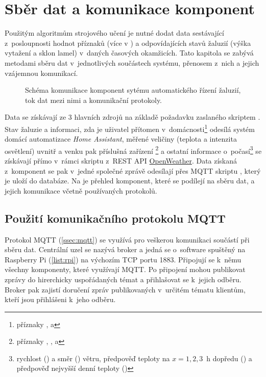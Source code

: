 \chapter{Sběr dat a komunikace komponent} \label{chap:dataCollection}
  Použitým algoritmům strojového učení je nutné dodat data sestávající z~posloupnosti hodnot příznaků (více v ) a odpovídajících stavů žaluzií (výška vytažení a sklon lamel) v~daných časových okamžicích. Tato kapitola se zabývá metodami sběru dat v~jednotlivých součástech systému, přenosem z~nich a jejich vzájemnou komunikací.
  
  \begin{figure}[H]
    \centering
    
    \caption[Schéma komunikace komponent]{Schéma komunikace komponent sytému automatického řízení žaluzií, tok dat mezi nimi a komunikační protokoly.}
    \label{fig:comm}
  \end{figure}

  Data se získávají ze 3 hlavních zdrojů na základě požadavku zaslaného skriptem . Stav žaluzie a informaci, zda je uživatel přítomen v~domácnosti\footnote{příznaky ,  a } odesílá systém domácí automatizace \emph{Home Assistant}, měřené veličiny (teplota a intenzita osvětlení) uvnitř a venku pak příslušná zařízení \footnote{příznaky , ,  a } a ostatní informace o~počasí\footnote{rychlost () a směr () větru, předpověď teploty na $x=1,2,3$~h dopředu () a předpověď nejvyšší denní teploty ()} se získávají přímo v~rámci skriptu  z~REST API \href{https://openweathermap.org/}{OpenWeather}. Data získaná z~komponent se pak v~jedné společné zprávě odesílají přes MQTT skriptu , který je uloží do databáze. Na  je přehled komponent, které se podílejí na sběru dat, a jejich komunikace včetně používaných protokolů.
  \section{Použití komunikačního protokolu MQTT} \label{sec:MQTT}
    Protokol MQTT (\cref{ssec:mqtt}) %
    se využívá pro veškerou komunikaci součástí při sběru dat. Centrální uzel se nazývá broker a jedná se o~software spuštěný na Raspberry Pi (\cref{list:rpi}) na výchozím TCP portu 1883. Připojují se k~němu všechny komponenty, které využívají MQTT. Po připojení mohou publikovat zprávy do hirerchicky uspořádaných témat a přihlašovat se k~jejich odběru. Broker pak zajistí doručení zpráv publikovaných v~určitém tématu klientům, kteří jsou přihlášeni k~jeho odběru.
    
